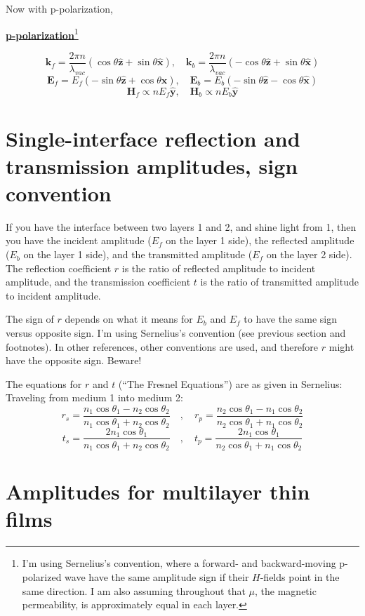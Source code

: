 \documentclass[12pt]{article}
\renewcommand{\(}{\left(}
\renewcommand{\)}{\right)}
\newcommand{\E}{\mathbf{E}}
\renewcommand{\H}{\mathbf{H}}
\renewcommand{\k}{\mathbf{k}}
\newcommand{\x}{\hat{\mathbf{x}}}
\newcommand{\y}{\hat{\mathbf{y}}}
\newcommand{\z}{\hat{\mathbf{z}}}
\begin{document}
Now with p-polarization,
\begin{center} {\bf \underline{p-polarization}}\footnote{I'm using Sernelius's convention, where a forward- and backward-moving p-polarized wave have the same amplitude sign if their $H$-fields point in the same direction. I am also assuming throughout that $\mu$, the magnetic permeability, is approximately equal in each layer.} \end{center}
$$\k_f =\frac{2\pi n}{\lambda_{vac}}\( \cos \theta \z + \sin \theta \x\), \quad \k_b = \frac{2\pi n}{\lambda_{vac}}\(- \cos \theta \z + \sin \theta \x\)$$
$$\E_f = E_f(-\sin \theta \z +  \cos \theta \x), \quad \E_b = E_b(- \sin \theta \z -  \cos \theta \x)$$
$$\H_f \propto n E_f \y, \quad \H_b \propto n E_b \y$$

\section{Single-interface reflection and transmission amplitudes, sign convention}

If you have the interface between two layers 1 and 2, and shine light from 1, then you have the incident amplitude ($E_f$ on the layer 1 side), the reflected amplitude ($E_b$ on the layer 1 side), and the transmitted amplitude ($E_f$ on the layer 2 side). The reflection coefficient $r$ is the ratio of reflected amplitude to incident amplitude, and the transmission coefficient $t$ is the ratio of transmitted amplitude to incident amplitude.

The sign of $r$ depends on what it means for $E_b$ and $E_f$ to have the same sign versus opposite sign. I'm using Sernelius's convention (see previous section and footnotes). In other references, other conventions are used, and therefore $r$ might have the opposite sign. Beware!

The equations for $r$ and $t$ (``The Fresnel Equations'') are as given in Sernelius: Traveling from medium 1 into medium 2:
$$r_s = \frac{n_1 \cos \theta_1 - n_2 \cos \theta_2}{n_1 \cos \theta_1 + n_2 \cos \theta_2} \quad , \quad r_p = \frac{n_2 \cos \theta_1 - n_1 \cos \theta_2}{n_2 \cos \theta_1 + n_1 \cos \theta_2}$$
$$ t_s = \frac{2n_1 \cos \theta_1}{n_1 \cos \theta_1 + n_2 \cos \theta_2} \quad , \quad t_p = \frac{2n_1 \cos \theta_1}{n_2 \cos \theta_1 + n_1 \cos \theta_2}$$


\section{Amplitudes for multilayer thin films}
\end{document}
